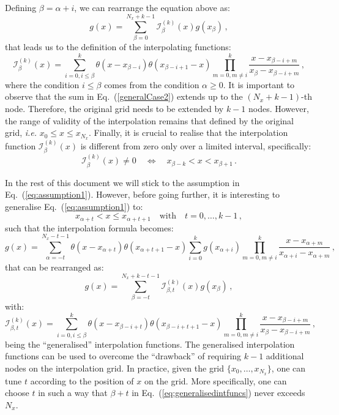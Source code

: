 \documentclass[10pt,a4paper]{article}
\begin{document}
Defining $\beta=\alpha+i$, we can rearrange the equation above as:
\begin{equation}\label{generalCase2}
  g(x) =
  \sum_{\beta=0}^{N_x+k-1}\mathcal{I}_\beta^{(k)}(x) g(x_{\beta})\,,
\end{equation}
that leads us to the definition of the interpolating functions:
\begin{equation}\label{eq:intfunc}
  \mathcal{I}_\beta^{(k)}(x) = \sum_{i=0,i\leq\beta}^k
  \theta(x-x_{\beta-i})\theta(x_{\beta-i+1}-x) \prod^{k}_{m=0,m\ne
    i}\frac{x-x_{\beta-i+m}}{x_{\beta}-x_{\beta-i+m}}\,,
\end{equation}
where the condition $i\leq\beta$ comes from the condition
$\alpha\geq 0$. It is important to observe that the sum in
Eq.~(\ref{generalCase2}) extends up to the $(N_x+k-1)$-th
node. Therefore, the original grid needs to be extended by $k-1$
nodes. However, the range of validity of the interpolation remains
that defined by the original grid, \textit{i.e.}
$x_0 \leq x \leq x_{N_x}$. Finally, it is crucial to realise that the
interpolation function $\mathcal{I}_\beta^{(k)}(x)$ is different from
zero only over a limited interval, specifically:
\begin{equation}\label{eq:limits}
\mathcal{I}_\beta^{(k)}(x) \neq 0\quad \Leftrightarrow\quad
x_{\beta-k}<x < x_{\beta+1}\,.
\end{equation}

In the rest of this document we will stick to the assumption in
Eq.~(\ref{eq:assumption1}). However, before going further, it is
interesting to generalise Eq.~(\ref{eq:assumption1}) to:
\begin{equation}\label{IntAssumptionGen}
  x_{\alpha+t} < x \leq
  x_{\alpha+t+1}\quad\mbox{with}\quad t = 0,\dots,k-1\,,
\end{equation}
such that the interpolation formula becomes:
\begin{equation}\label{MoreGeneralCase}
  g(x) =
  \sum_{\alpha=-t}^{N_x-t-1}\theta(x-x_{\alpha+t})\theta(x_{\alpha+t+1}-x)\sum_{i=0}^k
  g(x_{\alpha+i})\prod^{k}_{m=0,m\ne
    i}\frac{x-x_{\alpha+m}}{x_{\alpha+i}-x_{\alpha+m}}\,,
\end{equation}
that can be rearranged as:
\begin{equation}\label{generalCase3} g(x) =
\sum_{\beta=-t}^{N_x+k-t-1}\mathcal{I}_{\beta,t}^{(k)}(x) g(x_{\beta})\,,
\end{equation}
with:
\begin{equation}\label{eq:generalisedintfuncs}
\mathcal{I}_{\beta,t}^{(k)}(x) = \sum_{i=0,i\leq\beta}^k
\theta(x-x_{\beta-i+t})\theta(x_{\beta-i+t+1}-x) \prod^{k}_{m=0,m\ne
i}\frac{x-x_{\beta-i+m}}{x_{\beta}-x_{\beta-i+m}}\,,
\end{equation}
being the ``generalised'' interpolation functions.  The generalised
interpolation functions can be used to overcome the ``drawback'' of
requiring $k-1$ additional nodes on the interpolation grid. In
practice, given the grid $\{x_0,\dots,x_{N_x}\}$, one can tune $t$
according to the position of $x$ on the grid. More specifically, one
can choose $t$ in such a way that $\beta+t$ in
Eq.~(\ref{eq:generalisedintfuncs}) never exceeds $N_x$.
\end{document}
